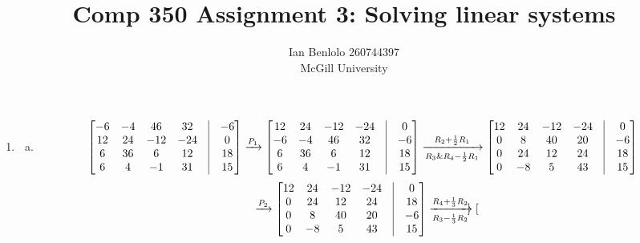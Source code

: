 
\usepackage{cancel}
\usepackage{mathtools}
\usepackage{amsmath}
\usepackage{pdfpages}
\usepackage{appendix}
\usepackage{enumerate}
\title{Comp 350 Assignment 3: Solving linear systems}
\author{Ian Benlolo 260744397\\McGill University \\}

\maketitle

\begin{enumerate}[1)]
\item \begin{enumerate}[(a)]
	\item
\[
\begin{bmatrix}
-6 & -4 & 46 & 32 & \vline &-6 \\
12 & 24 & -12 & -24 & \vline & 0\\
6 & 36 & 6 & 12 & \vline & 18\\
6 & 4 & -1 & 31 & \vline & 15\\
\end{bmatrix}
\xrightarrow[]{P_1 }
\begin{bmatrix}
12 & 24 & -12 & -24 & \vline & 0\\
-6 & -4 & 46 & 32 & \vline &-6 \\
6 & 36 & 6 & 12 & \vline & 18\\
6 & 4 & -1 & 31 & \vline & 15\\
\end{bmatrix}
\xrightarrow[R_3 \& R_4 -\frac{1}{2}R_1]{R_2+\frac{1}{2}R_1 }
\begin{bmatrix}
12 & 24 & -12 & -24 & \vline & 0\\
0 & 8 & 40 & 20 & \vline & -6\\ 
0 & 24 & 12 & 24 & \vline & 18\\
0 & -8 & 5 & 43 & \vline & 15\\
\end{bmatrix}
\]
\[
\xrightarrow[]{P_2}
\begin{bmatrix}
12 & 24 & -12 & -24 & \vline & 0\\
0 & 24 & 12 & 24 & \vline & 18\\
0 & 8 & 40 & 20 & \vline & -6\\ 
0 & -8 & 5 & 43 & \vline & 15\\
\end{bmatrix}
\xrightarrow[R_3 - \frac{1}{3}R_2]{ R_4 +  \frac{1}{3}R_2}
\begin{bmatrix}

\end{bmatrix}\]
\end{enumerate}
\end{enumerate}
